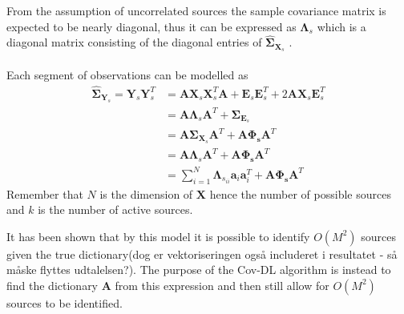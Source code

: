 From the assumption of uncorrelated sources the sample covariance matrix is expected to be nearly diagonal, thus it can be expressed as $\boldsymbol{\Lambda}_s$ which is a diagonal matrix consisting of the diagonal entries of $\hat{\boldsymbol{\Sigma}}_{\mathbf{X}_s}$ \cite{Balkan2015}.
\\ \\
Each segment of observations can be modelled as
\begin{align}\label{eq:cov_model}
\hat{\boldsymbol{\Sigma}}_{\mathbf{Y}_s} = \mathbf{Y}_s \mathbf{Y}_s^T &= \mathbf{A} \mathbf{X}_s \mathbf{X}_s^T \mathbf{A} + \mathbf{E}_s \mathbf{E}_s^T + 2 \mathbf{A} \mathbf{X}_s \mathbf{E}_s^T \nonumber \\
&= \mathbf{A} \boldsymbol{\Lambda}_s \mathbf{A}^T + \boldsymbol{\Sigma}_{\mathbf{E}_s} \nonumber \\
&= \mathbf{A} \boldsymbol{\Sigma}_{\mathbf{X}_s} \mathbf{A}^T + \mathbf{A} \boldsymbol{\Phi_s} \mathbf{A}^T  \nonumber \\
&= \mathbf{A} \boldsymbol{\Lambda}_s \mathbf{A}^T + \mathbf{A} \boldsymbol{\Phi_s} \mathbf{A}^T \nonumber \\
&= \sum_{i=1}^{N} \boldsymbol{\Lambda}_{s_{ii}} \textbf{a}_i\textbf{a}_i^{T} + \mathbf{A} \boldsymbol{\Phi_s} \mathbf{A}^T
\end{align}
Remember that $N$ is the dimension of $\mathbf{X}$ hence the number of possible sources and $k$ is the number of active sources.



It has been shown that by this model it is possible to identify $O(M^2)$ sources given the true dictionary\cite{Pal2015}(dog er vektoriseringen også includeret i resultatet - så måske flyttes udtalelsen?). The purpose of the Cov-DL algorithm is instead to find the dictionary $\textbf{A}$ from this expression and then still allow for $O(M^2)$ sources to be identified.

